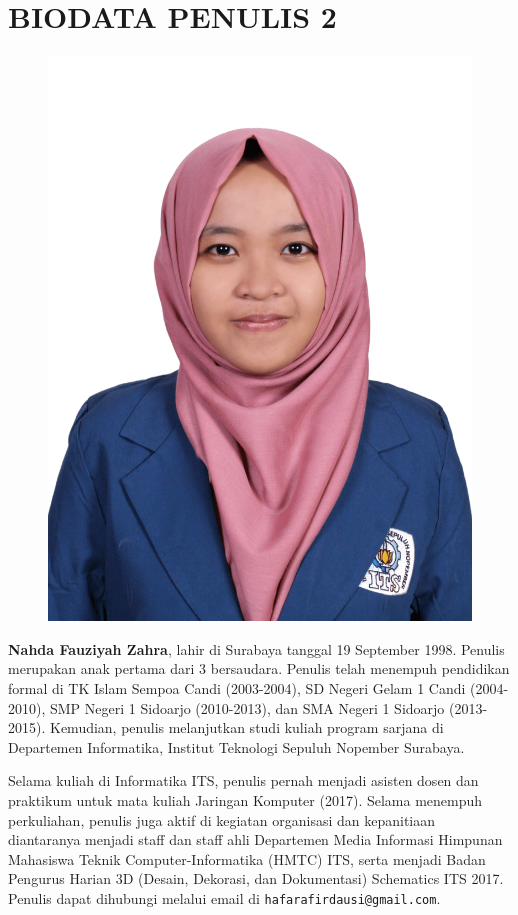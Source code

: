 \cleardoublepage

\newpage
\chapter{BIODATA PENULIS 2}
\begin{figure}
	\includegraphics[height=0.3\textheight]{biodata/img/foto-hf.png}
\end{figure}

\textbf{Nahda Fauziyah Zahra}, lahir di Surabaya tanggal 19 September 1998. Penulis merupakan anak pertama dari 3 bersaudara. Penulis telah menempuh pendidikan formal di TK Islam Sempoa Candi (2003-2004), SD Negeri Gelam 1 Candi (2004-2010), SMP Negeri 1 Sidoarjo (2010-2013), dan SMA Negeri 1 Sidoarjo (2013-2015). Kemudian, penulis melanjutkan studi kuliah program sarjana di Departemen Informatika, Institut Teknologi Sepuluh Nopember Surabaya. 

Selama kuliah di Informatika ITS, penulis pernah menjadi asisten dosen dan praktikum untuk mata kuliah Jaringan Komputer (2017). Selama menempuh perkuliahan, penulis juga aktif di kegiatan organisasi dan kepanitiaan diantaranya menjadi staff dan staff ahli Departemen Media Informasi Himpunan Mahasiswa Teknik Computer-Informatika (HMTC) ITS, serta menjadi Badan Pengurus Harian 3D (Desain, Dekorasi, dan Dokumentasi) Schematics ITS 2017. Penulis dapat dihubungi melalui email di  \texttt{hafarafirdausi@gmail.com}.